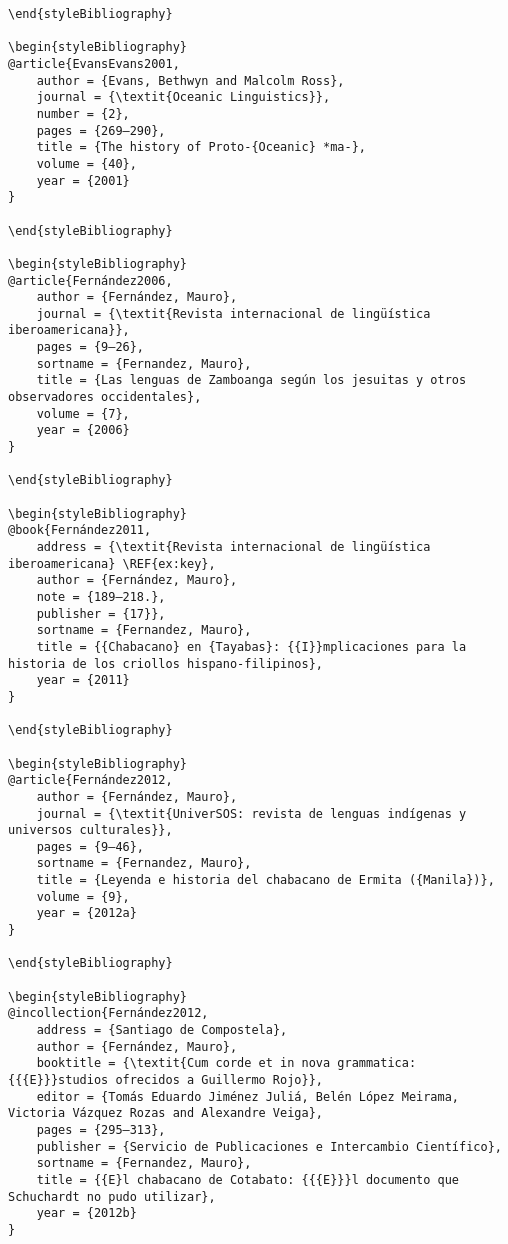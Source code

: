 \documentclass[output=paper]{langsci/langscibook}
\begin{document}
\begin{stylelsUnNumberedSection}
\begin{verbatim}
\end{styleBibliography}

\begin{styleBibliography}
@article{EvansEvans2001,
	author = {Evans, Bethwyn and Malcolm Ross},
	journal = {\textit{Oceanic Linguistics}},
	number = {2},
	pages = {269–290},
	title = {The history of Proto-{Oceanic} *ma-},
	volume = {40},
	year = {2001}
}

\end{styleBibliography}

\begin{styleBibliography}
@article{Fernández2006,
	author = {Fernández, Mauro},
	journal = {\textit{Revista internacional de lingüística iberoamericana}},
	pages = {9–26},
	sortname = {Fernandez, Mauro},
	title = {Las lenguas de Zamboanga según los jesuitas y otros observadores occidentales},
	volume = {7},
	year = {2006}
}

\end{styleBibliography}

\begin{styleBibliography}
@book{Fernández2011,
	address = {\textit{Revista internacional de lingüística iberoamericana} \REF{ex:key},
	author = {Fernández, Mauro},
	note = {189–218.},
	publisher = {17}},
	sortname = {Fernandez, Mauro},
	title = {{Chabacano} en {Tayabas}: {{I}}mplicaciones para la historia de los criollos hispano-filipinos},
	year = {2011}
}

\end{styleBibliography}

\begin{styleBibliography}
@article{Fernández2012,
	author = {Fernández, Mauro},
	journal = {\textit{UniverSOS: revista de lenguas indígenas y universos culturales}},
	pages = {9–46},
	sortname = {Fernandez, Mauro},
	title = {Leyenda e historia del chabacano de Ermita ({Manila})},
	volume = {9},
	year = {2012a}
}

\end{styleBibliography}

\begin{styleBibliography}
@incollection{Fernández2012,
	address = {Santiago de Compostela},
	author = {Fernández, Mauro},
	booktitle = {\textit{Cum corde et in nova grammatica: {{{E}}}studios ofrecidos a Guillermo Rojo}},
	editor = {Tomás Eduardo Jiménez Juliá, Belén López Meirama, Victoria Vázquez Rozas and Alexandre Veiga},
	pages = {295–313},
	publisher = {Servicio de Publicaciones e Intercambio Científico},
	sortname = {Fernandez, Mauro},
	title = {{E}l chabacano de Cotabato: {{{E}}}l documento que Schuchardt no pudo utilizar},
	year = {2012b}
}


\end{verbatim}
\end{stylelsUnNumberedSection}
\end{document}
